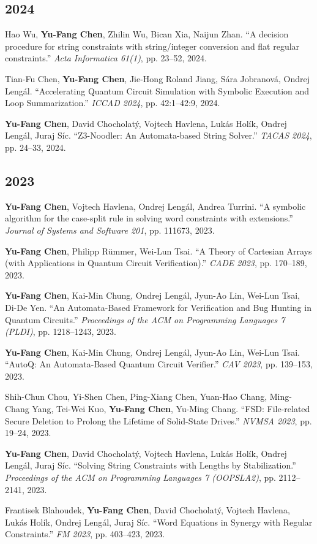 \documentclass[10.5pt]{article}
\begin{document}
\subsection*{2024}
\begin{enumerate}[leftmargin=*,label={[\arabic*]},resume]
\item Hao Wu, \textbf{Yu-Fang Chen}, Zhilin Wu, Bican Xia, Naijun Zhan. ``A decision procedure for string constraints with string/integer conversion and flat regular constraints.'' \emph{Acta Informatica 61(1)}, pp. 23--52, 2024.
\item Tian-Fu Chen, \textbf{Yu-Fang Chen}, Jie-Hong Roland Jiang, Sára Jobranová, Ondrej Lengál. ``Accelerating Quantum Circuit Simulation with Symbolic Execution and Loop Summarization.'' \emph{ICCAD 2024}, pp. 42:1--42:9, 2024.
\item \textbf{Yu-Fang Chen}, David Chocholatý, Vojtech Havlena, Lukás Holík, Ondrej Lengál, Juraj Síc. ``Z3-Noodler: An Automata-based String Solver.'' \emph{TACAS 2024}, pp. 24--33, 2024.
\end{enumerate}
\subsection*{2023}
\begin{enumerate}[leftmargin=*,label={[\arabic*]},resume]
\item \textbf{Yu-Fang Chen}, Vojtech Havlena, Ondrej Lengál, Andrea Turrini. ``A symbolic algorithm for the case-split rule in solving word constraints with extensions.'' \emph{Journal of Systems and Software 201}, pp. 111673, 2023.
\item \textbf{Yu-Fang Chen}, Philipp Rümmer, Wei-Lun Tsai. ``A Theory of Cartesian Arrays (with Applications in Quantum Circuit Verification).'' \emph{CADE 2023}, pp. 170--189, 2023.
\item \textbf{Yu-Fang Chen}, Kai-Min Chung, Ondrej Lengál, Jyun-Ao Lin, Wei-Lun Tsai, Di-De Yen. ``An Automata-Based Framework for Verification and Bug Hunting in Quantum Circuits.'' \emph{Proceedings of the ACM on Programming Languages 7 (PLDI)}, pp. 1218--1243, 2023.
\item \textbf{Yu-Fang Chen}, Kai-Min Chung, Ondrej Lengál, Jyun-Ao Lin, Wei-Lun Tsai. ``AutoQ: An Automata-Based Quantum Circuit Verifier.'' \emph{CAV 2023}, pp. 139--153, 2023.
\item Shih-Chun Chou, Yi-Shen Chen, Ping-Xiang Chen, Yuan-Hao Chang, Ming-Chang Yang, Tei-Wei Kuo, \textbf{Yu-Fang Chen}, Yu-Ming Chang. ``FSD: File-related Secure Deletion to Prolong the Lifetime of Solid-State Drives.'' \emph{NVMSA 2023}, pp. 19--24, 2023.
\item \textbf{Yu-Fang Chen}, David Chocholatý, Vojtech Havlena, Lukás Holík, Ondrej Lengál, Juraj Síc. ``Solving String Constraints with Lengths by Stabilization.'' \emph{Proceedings of the ACM on Programming Languages 7 (OOPSLA2)}, pp. 2112--2141, 2023.
\item Frantisek Blahoudek, \textbf{Yu-Fang Chen}, David Chocholatý, Vojtech Havlena, Lukás Holík, Ondrej Lengál, Juraj Síc. ``Word Equations in Synergy with Regular Constraints.'' \emph{FM 2023}, pp. 403--423, 2023.
\end{enumerate}
\end{document}
